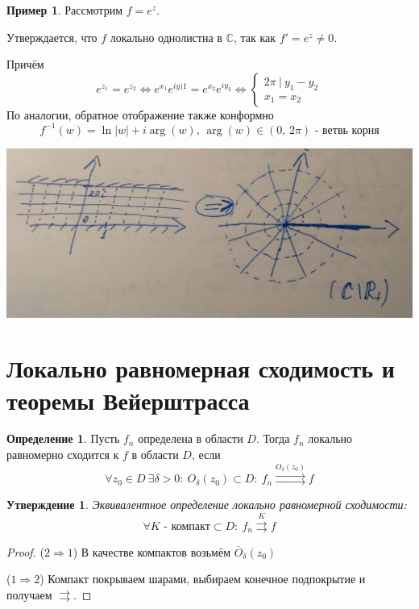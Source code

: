 \documentclass[a4paper,12pt]{article}
\theoremstyle{plain}
\newtheorem{proposition}{Утверждение}[section]
\theoremstyle{definition}
\newtheorem{definition}{Определение}[section]
\newtheorem*{example}{Пример}
\theoremstyle{remark}
\begin{document}
\begin{example}
	Рассмотрим $f = e^z$.

	Утверждается, что $f$ локально однолистна в $\mathbb{C}$, так как $f' = e^z \neq 0$.

	Причём
	\[
		e^{z_1} = e^{z_2} \Leftrightarrow e^{x_1}e^{iy)1} = e^{x_2}e^{iy_2} \Leftrightarrow \begin{cases}
			2\pi \:\vert\: y_1 - y_2\\
			x_1 = x_2
		\end{cases}
	\]
	По аналогии, обратное отображение также конформно
	\[
		f^{-1}(w) = \ln\vert w\vert + i\arg(w),\, \arg(w) \in (0,\, 2\pi) \text{ - ветвь корня}	
	\] 

	\includegraphics[scale=0.3]{assets/exp_ex.png}
\end{example}

\section{Локально равномерная сходимость и теоремы Вейерштрасса}
\begin{definition}
	Пусть $f_n$ определена в области $D$. Тогда $f_n$ локально равномерно сходится к $f$ в области $D$, если
	\[
		\forall z_0 \in D \: \exists \delta > 0 :\: O_\delta(z_0) \subset D :\: f_n \overset{O_\delta(z_0)}{\rightrightarrows} f
	\]
\end{definition}

\begin{proposition}
	Эквивалентное определение локально равномерной сходимости:
	\[
		\forall K \text{ - компакт}\subset D :\: f_n \overset{K}{\rightrightarrows} f
	\]
\end{proposition}

\begin{proof}
	($2 \Rightarrow 1$) В качестве компактов возьмём $\overline{O}_\delta(z_0)$

	($1 \Rightarrow 2$) Компакт покрываем шарами, выбираем конечное подпокрытие и получаем $\rightrightarrows$.
\end{proof}
\end{document}
